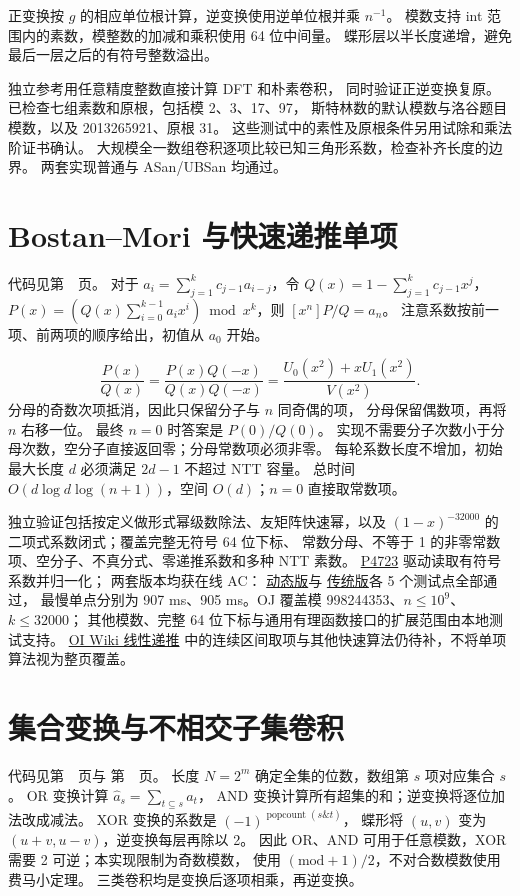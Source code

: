 正变换按 $g$ 的相应单位根计算，逆变换使用逆单位根并乘 $n^{-1}$。
模数支持 int 范围内的素数，模整数的加减和乘积使用 64 位中间量。
蝶形层以半长度递增，避免最后一层之后的有符号整数溢出。

独立参考用任意精度整数直接计算 DFT 和朴素卷积，
同时验证正逆变换复原。已检查七组素数和原根，包括模 2、3、17、97，
斯特林数的默认模数与洛谷题目模数，以及 2013265921、原根 31。
这些测试中的素性及原根条件另用试除和乘法阶证书确认。
大规模全一数组卷积逐项比较已知三角形系数，检查补齐长度的边界。
两套实现普通与 ASan/UBSan 均通过。


\clearpage
\section{Bostan--Mori 与快速递推单项}\label{knowledge-bostan-mori}
代码见第~\pageref{compact-BostanMori}~页。
对于 $a_i=\sum_{j=1}^k c_{j-1}a_{i-j}$，令
$Q(x)=1-\sum_{j=1}^k c_{j-1}x^j$，
$P(x)=(Q(x)\sum_{i=0}^{k-1}a_ix^i)\bmod x^k$，则 $[x^n]P/Q=a_n$。
注意系数按前一项、前两项的顺序给出，初值从 $a_0$ 开始。

\[
 \frac{P(x)}{Q(x)}=\frac{P(x)Q(-x)}{Q(x)Q(-x)}
 =\frac{U_0(x^2)+xU_1(x^2)}{V(x^2)}.
\]
分母的奇数次项抵消，因此只保留分子与 $n$ 同奇偶的项，
分母保留偶数项，再将 $n$ 右移一位。
最终 $n=0$ 时答案是 $P(0)/Q(0)$。
实现不需要分子次数小于分母次数，空分子直接返回零；分母常数项必须非零。
每轮系数长度不增加，初始最大长度 $d$ 必须满足 $2d-1$ 不超过 NTT 容量。
总时间 $O(d\log d\log(n+1))$，空间 $O(d)$；$n=0$ 直接取常数项。

独立验证包括按定义做形式幂级数除法、友矩阵快速幂，以及
$(1-x)^{-32000}$ 的二项式系数闭式；覆盖完整无符号 64 位下标、
常数分母、不等于 1 的非零常数项、空分子、不真分式、零递推系数和多种 NTT 素数。
\href{https://www.luogu.com.cn/problem/P4723}{P4723} 驱动读取有符号系数并归一化；
两套版本均获在线 AC：
\href{https://www.luogu.com.cn/record/297628790}{动态版}与
\href{https://www.luogu.com.cn/record/297629192}{传统版}各 5 个测试点全部通过，
最慢单点分别为 907 ms、905 ms。OJ 覆盖模 998244353、$n\le10^9$、$k\le32000$；
其他模数、完整 64 位下标与通用有理函数接口的扩展范围由本地测试支持。
\href{https://oi-wiki.org/math/poly/linear-recurrence/}{OI Wiki 线性递推}
中的连续区间取项与其他快速算法仍待补，不将单项算法视为整页覆盖。

\clearpage
\section{集合变换与不相交子集卷积}\label{knowledge-subset-conv}
代码见第~\pageref{compact-SetConvolution}~页与
第~\pageref{compact-subset_convolution}~页。
长度 $N=2^m$ 确定全集的位数，数组第 $s$ 项对应集合 $s$。
OR 变换计算 $\widehat a_s=\sum_{t\subseteq s}a_t$，
AND 变换计算所有超集的和；逆变换将逐位加法改成减法。
XOR 变换的系数是 $(-1)^{\operatorname{popcount}(s\mathbin{\&}t)}$，
蝶形将 $(u,v)$ 变为 $(u+v,u-v)$，逆变换每层再除以 2。
因此 OR、AND 可用于任意模数，XOR 需要 2 可逆；本实现限制为奇数模数，
使用 $(\mathrm{mod}+1)/2$，不对合数模数使用费马小定理。
三类卷积均是变换后逐项相乘，再逆变换。

